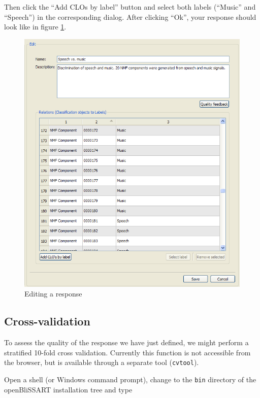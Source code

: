 Then click the ``Add CLOs by label'' button and select both labels (``Music''
and ``Speech'') in the corresponding dialog. After clicking ``Ok'', your
response should look like in figure \ref{figure:TutorialEditResponse}.

\begin{figure}
    \centering
    \includegraphics[width=\textwidth]{tutorial-media/EditResponse.png}
    \caption{%
        \label{figure:TutorialEditResponse}%
        Editing a response
    }
\end{figure}


\subsection{Cross-validation}

To assess the quality of the response we have just defined, we might perform a
stratified 10-fold cross validation. Currently this function is not accessible
from the browser, but is available through a separate tool ({\tt cvtool}).

Open a shell (or Windows command prompt), change to the {\tt bin} directory of
the openBliSSART installation tree and type

